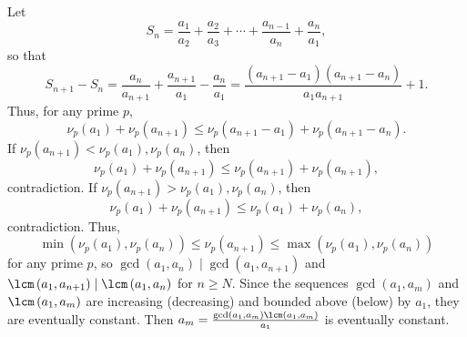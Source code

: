 Let \[S_n=\frac{a_1}{a_2}+\frac{a_2}{a_3}+\cdots+\frac{a_{n-1}}{a_n}+\frac{a_n}{a_1},\] so that \[S_{n+1}-S_n=\frac{a_n}{a_{n+1}}+\frac{a_{n+1}}{a_1}-\frac{a_n}{a_1}=\frac{\left(a_{n+1}-a_1\right)\left(a_{n+1}-a_n\right)}{a_1a_{n+1}}+1.\] Thus, for any prime $p$, \[\nu_p\left(a_1\right)+\nu_p\left(a_{n+1}\right)\leq\nu_p\left(a_{n+1}-a_1\right)+\nu_p\left(a_{n+1}-a_n\right).\] If $\nu_p\left(a_{n+1}\right)<\nu_p\left(a_1\right),\nu_p\left(a_n\right)$, then \[\nu_p\left(a_1\right)+\nu_p\left(a_{n+1}\right)\leq\nu_p\left(a_{n+1}\right)+\nu_p\left(a_{n+1}\right),\] contradiction. If $\nu_p\left(a_{n+1}\right)>\nu_p\left(a_1\right),\nu_p\left(a_n\right)$, then \[\nu_p\left(a_1\right)+\nu_p\left(a_{n+1}\right)\leq\nu_p\left(a_1\right)+\nu_p\left(a_n\right),\] contradiction. Thus, \[\min\left(\nu_p\left(a_1\right),\nu_p\left(a_n\right)\right)\leq\nu_p\left(a_{n+1}\right)\leq\max\left(\nu_p\left(a_1\right),\nu_p\left(a_n\right)\right)\] for any prime $p$, so $\gcd\left(a_1,a_n\right)\mid\gcd\left(a_1,a_{n+1}\right)$ and $\lcm\left(a_1,a_{n+1}\right)\mid\lcm\left(a_1,a_n\right)$ for $n\geq N$. Since the sequences $\gcd\left(a_1,a_m\right)$ and $\lcm\left(a_1,a_m\right)$ are increasing (decreasing) and bounded above (below) by $a_1$, they are eventually constant. Then $a_m=\frac{\gcd\left(a_1,a_m\right)\lcm\left(a_1,a_m\right)}{a_1}$ is eventually constant.
